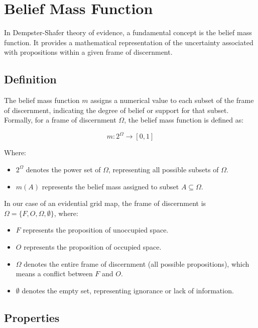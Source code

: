 
\section{Belief Mass Function}

In Dempster-Shafer theory of evidence, a fundamental concept is the belief mass function.
It provides a mathematical representation of the uncertainty associated with propositions within a given frame of discernment.

\subsection{Definition}

The belief mass function $ m $ assigns a numerical value to each subset of the frame of discernment, indicating the degree of belief or support for that subset. Formally, for a frame of discernment $ \Omega $, the belief mass function is defined as:

$$ m: 2^\Omega \rightarrow [0,1] $$

Where:

\begin{itemize}
    \item $ 2^\Omega $ denotes the power set of $ \Omega $, representing all possible subsets of $ \Omega $.
    \item $ m(A) $ represents the belief mass assigned to subset $ A \subseteq \Omega $.
\end{itemize}

In our case of an evidential grid map, the frame of discernment is $\Omega = \{F, O, \Omega, \emptyset\}$, where:

\begin{itemize}
    \item $ F $ represents the proposition of unoccupied space.
    \item $ O $ represents the proposition of occupied space.
    \item $ \Omega $ denotes the entire frame of discernment (all possible propositions), which means a conflict between $ F $ and $ O $.
    \item $ \emptyset $ denotes the empty set, representing ignorance or lack of information.
\end{itemize}

\subsection{Properties}

